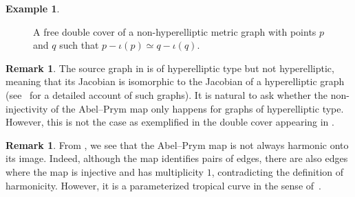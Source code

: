 \documentclass[11pt]{article}
\theoremstyle{definition}
\newtheorem{exam}[theo]{Example}
\newtheorem{rema}[theo]{Remark}
\numberwithin{equation}{section}
\theoremstyle{definition}
\begin{document}
\begin{exam}
\begin{figure}[ht]
 \caption{A free double cover of a non-hyperelliptic metric graph with points $p$ and $q$ such that $p-\iota(p)\simeq q-\iota(q)$.}
    \label{hyptype}
\end{figure}
\end{exam}




\begin{rema}\label{rem:hyperellipticType}
    The source graph in 
    is of hyperelliptic type but not hyperelliptic, meaning that its Jacobian is isomorphic to the Jacobian of a hyperelliptic graph (see~\cite{C} for a detailed account of such graphs). 
  It is natural to ask whether the non-injectivity of the Abel--Prym map only happens for graphs of hyperelliptic type. However, this is not the case as exemplified in the double cover appearing in .
\end{rema}


\begin{rema} 
From , we see that the Abel--Prym map is not always  harmonic  onto its image. Indeed, although the map identifies pairs of edges, there are also edges where the map is injective and has multiplicity $1$, contradicting the definition of harmonicity.
However, it is a parameterized tropical curve in the sense of~\cite[Definition 3.1]{Blomme_CurvesInAbelian1}.
\end{rema}
\end{document}
